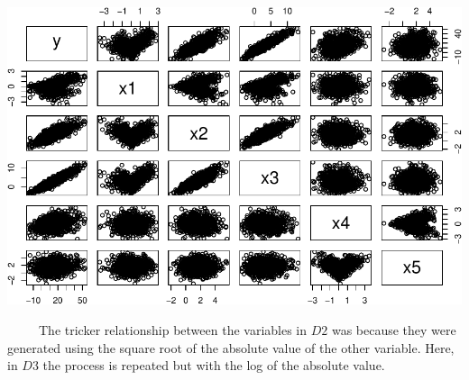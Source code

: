 \documentclass[12pt,twoside]{reedthesis}
\begin{document}
  \begin{Shaded}
  \begin{Highlighting}[]
  \end{Highlighting}
  \end{Shaded}
  
  \begin{center}\includegraphics{Thesis_files/figure-latex/sqrtAbs-1} \end{center}
  
  ~~~~~The tricker relationship between the variables in \(D2\) was
  because they were generated using the square root of the absolute value
  of the other variable. Here, in \(D3\) the process is repeated but with
  the log of the absolute value.
  
\end{document}
